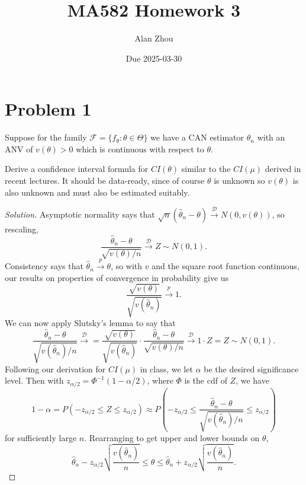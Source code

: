 \documentclass{article}
\title{MA582 Homework 3}
\author{Alan Zhou}
\date{Due 2025-03-30}
\begin{document}
\maketitle


\section{Problem 1}

Suppose for the family $\mathcal{F} = \{f_{\theta} : \theta\in\Theta\}$ we have a CAN estimator $\hat{\theta}_n$ with an ANV of $v(\theta) > 0$ which is continuous with respect to $\theta$.

Derive a confidence interval formula for $CI(\theta)$ similar to the $CI(\mu)$ derived in recent lectures. It should be data-ready, since of course $\theta$ is unknown so $v(\theta)$ is also unknown and must also be estimated suitably.

\begin{proof}[Solution]
Asymptotic normality says that $\sqrt{n}(\hat{\theta}_n - \theta)\stackrel{\mathcal{D}}{\longrightarrow} N(0, v(\theta))$, so rescaling,
\begin{equation*}
\frac{\hat{\theta}_n - \theta}{\sqrt{v(\theta)/n}}\stackrel{\mathcal{D}}{\longrightarrow} Z\sim N(0,1).
\end{equation*}
Consistency says that $\hat{\theta}_n\stackrel{p}{\to}\theta$, so with $v$ and the square root function continuous, our results on properties of convergence in probability give us
\begin{equation*}
\frac{\sqrt{v(\theta)}}{\sqrt{v(\hat{\theta}_n)}}\stackrel{p}{\longrightarrow} 1.
\end{equation*}
We can now apply Slutsky's lemma to say that
\begin{equation*}
\frac{\hat{\theta}_n - \theta}{\sqrt{v(\hat{\theta}_n)/n}}\stackrel{\mathcal{D}}{\longrightarrow} = \frac{\sqrt{v(\theta)}}{\sqrt{v(\hat{\theta}_n)}}\cdot\frac{\hat{\theta}_n - \theta}{\sqrt{v(\theta)/n}}\stackrel{\mathcal{D}}{\longrightarrow} 1\cdot Z = Z\sim N(0,1).
\end{equation*}
Following our derivation for $CI(\mu)$ in class, we let $\alpha$ be the desired significance level. Then with $z_{\alpha/2} = \Phi^{-1}(1 - \alpha/2)$, where $\Phi$ is the cdf of $Z$, we have
\begin{equation*}
1 - \alpha = P(-z_{\alpha/2}\leq Z\leq z_{\alpha/2})\approx P\left(-z_{\alpha/2}\leq\frac{\hat{\theta}_n - \theta}{\sqrt{v(\hat{\theta}_n)/n}}\leq z_{\alpha/2}\right)
\end{equation*}
for sufficiently large $n$. Rearranging to get upper and lower bounds on $\theta$,
\begin{equation*}
\hat{\theta}_n - z_{\alpha/2}\sqrt{\frac{v(\hat{\theta}_n)}{n}}\leq\theta\leq\hat{\theta}_n + z_{\alpha/2}\sqrt{\frac{v(\hat{\theta}_n)}{n}}.
\end{equation*}
\end{proof}
\end{document}
